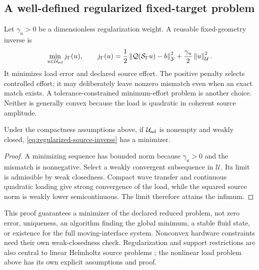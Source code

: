 \subsection{A well-defined regularized fixed-target problem}
Let $\gamma_u>0$ be a dimensionless regularization weight. A reusable
fixed-geometry inverse is
\begin{equation}
 \min_{u\in\mathcal U_{\rm ad}} j_\Gamma(u),\qquad
 j_\Gamma(u)=\frac12\left\lVert\mathcal Q(\mathcal S_\Gamma u)-b\right\rVert_{\mathcal Y}^2
                 +\frac{\gamma_u}{2}\left\lVert u\right\rVert_{\mathcal U}^2.
 \label{eq:regularized-source-inverse}
\end{equation}
It minimizes load error and declared source effort. The positive penalty
selects controlled effort; it may deliberately leave nonzero mismatch even
when an exact match exists. A tolerance-constrained minimum-effort problem
is another choice. Neither is generally convex because the load is quadratic
in coherent source amplitude.

\begin{proposition}
Under the compactness assumptions above, if $\mathcal U_{\rm ad}$ is
nonempty and weakly closed, \cref{eq:regularized-source-inverse} has a
minimizer.
\end{proposition}
\begin{proof}
A minimizing sequence has bounded norm because $\gamma_u>0$ and the
mismatch is nonnegative. Select a weakly convergent subsequence in
$\mathcal U$. Its limit is admissible by weak closedness. Compact wave
transfer and continuous quadratic loading give strong convergence of the
load, while the squared source norm is weakly lower semicontinuous. The
limit therefore attains the infimum.
\end{proof}
This proof guarantees a minimizer of the declared reduced problem, not zero
error, uniqueness, an algorithm finding the global minimum, a stable fluid
state, or existence for the full moving-interface system. Nonconvex hardware
constraints need their own weak-closedness check. Regularization and support
restrictions are also central to linear Helmholtz source problems
\cite{hubenthal2016,pieper2020}; the nonlinear load problem above has its own
explicit assumptions and proof.

